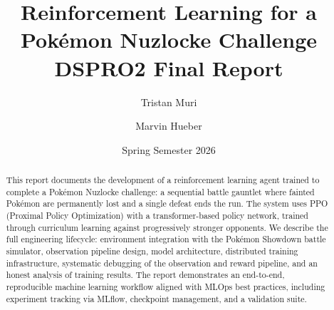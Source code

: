\documentclass[11pt,a4paper]{report}
\title{Reinforcement Learning for a Pok\'{e}mon Nuzlocke Challenge\\[0.3em]
\large DSPRO2 Final Report}
\author{Tristan Muri \and Marvin Hueber }%
\date{Spring Semester 2026}
\begin{document}
\maketitle

\begin{abstract}
This report documents the development of a reinforcement learning agent trained to complete a
Pok\'{e}mon Nuzlocke challenge: a sequential battle gauntlet where fainted Pok\'{e}mon are
permanently lost and a single defeat ends the run.  The system uses PPO (Proximal Policy
Optimization) with a transformer-based policy network, trained through curriculum learning against
progressively stronger opponents.  We describe the full engineering lifecycle: environment
integration with the Pok\'{e}mon Showdown battle simulator, observation pipeline design,
model architecture, distributed training infrastructure, systematic debugging of the observation
and reward pipeline, and an honest analysis of training results.  The report demonstrates an
end-to-end, reproducible machine learning workflow aligned with MLOps best practices, including
experiment tracking via MLflow, checkpoint management, and a validation suite.
\end{abstract}

\tableofcontents
\newpage








\appendix


\end{document}
